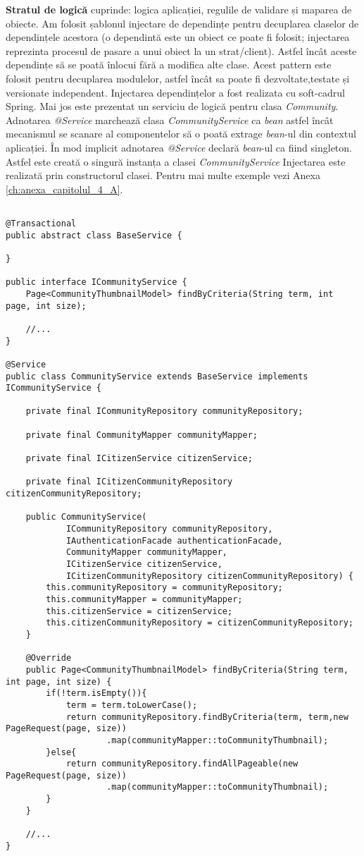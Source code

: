 \textbf{Stratul de logică} cuprinde: logica aplicației, regulile de validare și maparea de obiecte.
Am folosit șablonul injectare de dependințe pentru decuplarea claselor de dependințele
acestora (o dependintă este un obiect ce poate fi folosit; injectarea reprezinta procesul de pasare a
unui obiect la un strat/client). Astfel încât aceste dependințe să se poată înlocui fără a modifica
alte clase. Acest pattern este folosit pentru decuplarea modulelor, astfel încât sa poate fi
dezvoltate,testate și versionate independent. Injectarea dependințelor a fost realizata cu soft-cadrul
Spring. Mai jos este prezentat un serviciu de logică pentru clasa \textit{Community}.
Adnotarea \textit{@Service} marchează clasa \textit{CommunityService} ca \textit{bean} 
astfel încât mecanismul se scanare al componentelor să o poată extrage \textit{bean}-ul din contextul aplicației.
În mod implicit adnotarea \textit{@Service} declară \textit{bean}-ul ca fiind singleton. Astfel este
creată o singură instanța a clasei \textit{CommunityService} Injectarea este realizată prin constructorul clasei. Pentru mai multe exemple vezi 
Anexa \ref{ch:anexa_capitolul_4_A}.
\begin {lstlisting}

@Transactional
public abstract class BaseService {

}

public interface ICommunityService {
	Page<CommunityThumbnailModel> findByCriteria(String term, int page, int size);

	//...
}

@Service
public class CommunityService extends BaseService implements ICommunityService {

	private final ICommunityRepository communityRepository;
	 
    private final CommunityMapper communityMapper;
    
    private final ICitizenService citizenService;
    
    private final ICitizenCommunityRepository citizenCommunityRepository;

    public CommunityService(
    		ICommunityRepository communityRepository,
    		IAuthenticationFacade authenticationFacade,
    		CommunityMapper communityMapper,
    		ICitizenService citizenService,
    		ICitizenCommunityRepository citizenCommunityRepository) {
        this.communityRepository = communityRepository;
        this.communityMapper = communityMapper;
        this.citizenService = citizenService;
        this.citizenCommunityRepository = citizenCommunityRepository;
    }
    
	@Override
	public Page<CommunityThumbnailModel> findByCriteria(String term, int page, int size) {
		if(!term.isEmpty()){
			term = term.toLowerCase();
			return communityRepository.findByCriteria(term, term,new PageRequest(page, size))
					.map(communityMapper::toCommunityThumbnail);
		}else{
			return communityRepository.findAllPageable(new PageRequest(page, size))
					.map(communityMapper::toCommunityThumbnail);
		}
	}
	
	//...
}
\end{lstlisting}
